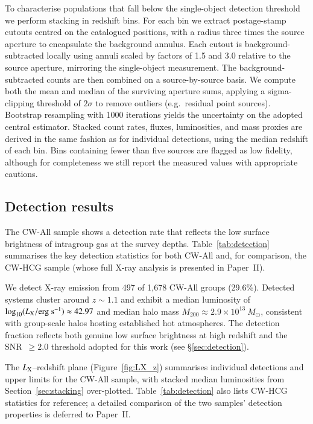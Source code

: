 \documentclass{aa}
\begin{document}
To characterise populations that fall below the single-object detection threshold we perform stacking in redshift bins. For each bin we extract postage-stamp cutouts centred on the catalogued positions, with a radius three times the source aperture to encapsulate the background annulus. Each cutout is background-subtracted locally using annuli scaled by factors of 1.5 and 3.0 relative to the source aperture, mirroring the single-object measurement. The background-subtracted counts are then combined on a source-by-source basis. We compute both the mean and median of the surviving aperture sums, applying a sigma-clipping threshold of $2\sigma$ to remove outliers (e.g.\ residual point sources). Bootstrap resampling with 1000 iterations yields the uncertainty on the adopted central estimator. Stacked count rates, fluxes, luminosities, and mass proxies are derived in the same fashion as for individual detections, using the median redshift of each bin. Bins containing fewer than five sources are flagged as low fidelity, although for completeness we still report the measured values with appropriate cautions.

\subsection{Detection results}

The CW-All sample shows a detection rate that reflects the low surface brightness of intragroup gas at the survey depths. Table~\ref{tab:detection} summarises the key detection statistics for both CW-All and, for comparison, the CW-HCG sample (whose full X-ray analysis is presented in Paper~II).

We detect X-ray emission from 497 of 1,678 CW-All groups (29.6\%). Detected systems cluster around $z \sim 1.1$ and exhibit a median luminosity of $\log_{10}(L_{\rm X}/\mathrm{erg~s}^{-1}) \approx 42.97$ and median halo mass $M_{200} \approx 2.9 \times 10^{13}~M_{\odot}$, consistent with group-scale halos hosting established hot atmospheres. The detection fraction reflects both genuine low surface brightness at high redshift and the SNR~$\geq 2.0$ threshold adopted for this work (see \S\ref{sec:detection}).

The $L_{\rm X}$--redshift plane (Figure~\ref{fig:LX_z}) summarises individual detections and upper limits for the CW-All sample, with stacked median luminosities from Section~\ref{sec:stacking} over-plotted. Table~\ref{tab:detection} also lists CW-HCG statistics for reference; a detailed comparison of the two samples' detection properties is deferred to Paper~II.
\end{document}
